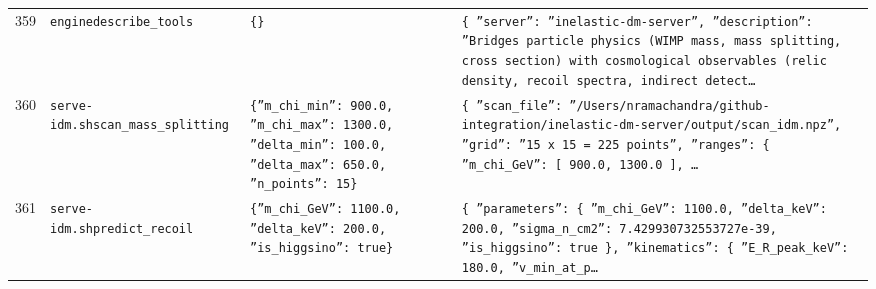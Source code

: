 \documentclass[11pt,a4paper]{article}
\begin{document}
\begin{longtable}{@{}p{}p{}p{}p{}@{}}
359 & \texttt{engine}\newline\texttt{describe\_\allowbreak{}tools} & \texttt{\{\}\allowbreak{}} & \texttt{\{   ''server'':\allowbreak{} ''inelastic-dm-server'',\allowbreak{}   ''description'':\allowbreak{} ''Bridges particle physics (WIMP mass,\allowbreak{} mass splitting,\allowbreak{} cross section)\allowbreak{} with cosmological observables (relic density,\allowbreak{} recoil spectra,\allowbreak{} indirect detect\ldots{}\allowbreak{}} \\
360 & \texttt{serve-idm.sh}\newline\texttt{scan\_\allowbreak{}mass\_\allowbreak{}splitting} & \texttt{\{''m\_\allowbreak{}chi\_\allowbreak{}min'':\allowbreak{} 900.0,\allowbreak{} ''m\_\allowbreak{}chi\_\allowbreak{}max'':\allowbreak{} 1300.0,\allowbreak{} ''delta\_\allowbreak{}min'':\allowbreak{} 100.0,\allowbreak{} ''delta\_\allowbreak{}max'':\allowbreak{} 650.0,\allowbreak{} ''n\_\allowbreak{}points'':\allowbreak{} 15\}\allowbreak{}} & \texttt{\{   ''scan\_\allowbreak{}file'':\allowbreak{} ''/\allowbreak{}Users/\allowbreak{}nramachandra/\allowbreak{}github-integration/\allowbreak{}inelastic-dm-server/\allowbreak{}output/\allowbreak{}scan\_\allowbreak{}idm.npz'',\allowbreak{}   ''grid'':\allowbreak{} ''15 x 15 =\allowbreak{} 225 points'',\allowbreak{}   ''ranges'':\allowbreak{} \{     ''m\_\allowbreak{}chi\_\allowbreak{}GeV'':\allowbreak{} [       900.0,\allowbreak{}       1300.0     ]\allowbreak{},\allowbreak{}  \ldots{}\allowbreak{}} \\
361 & \texttt{serve-idm.sh}\newline\texttt{predict\_\allowbreak{}recoil} & \texttt{\{''m\_\allowbreak{}chi\_\allowbreak{}GeV'':\allowbreak{} 1100.0,\allowbreak{} ''delta\_\allowbreak{}keV'':\allowbreak{} 200.0,\allowbreak{} ''is\_\allowbreak{}higgsino'':\allowbreak{} true\}\allowbreak{}} & \texttt{\{   ''parameters'':\allowbreak{} \{     ''m\_\allowbreak{}chi\_\allowbreak{}GeV'':\allowbreak{} 1100.0,\allowbreak{}     ''delta\_\allowbreak{}keV'':\allowbreak{} 200.0,\allowbreak{}     ''sigma\_\allowbreak{}n\_\allowbreak{}cm2'':\allowbreak{} 7.429930732553727e-39,\allowbreak{}     ''is\_\allowbreak{}higgsino'':\allowbreak{} true   \}\allowbreak{},\allowbreak{}   ''kinematics'':\allowbreak{} \{     ''E\_\allowbreak{}R\_\allowbreak{}peak\_\allowbreak{}keV'':\allowbreak{} 180.0,\allowbreak{}     ''v\_\allowbreak{}min\_\allowbreak{}at\_\allowbreak{}p\ldots{}\allowbreak{}} \\

\end{longtable}
\end{document}
